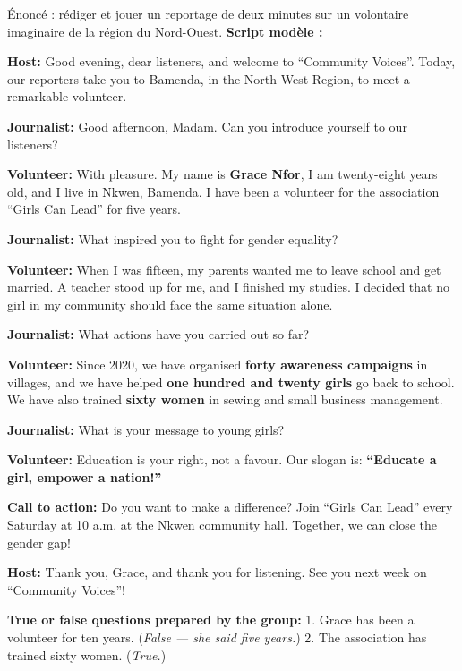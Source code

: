\documentclass[11pt]{article}
\begin{document}
\begin{exoresolu}
Énoncé : rédiger et jouer un reportage de deux minutes sur un volontaire imaginaire de la région du Nord-Ouest.
\tcblower
\textbf{Script modèle :}

\textbf{Host:} Good evening, dear listeners, and welcome to “Community Voices”. Today, our reporters take you to Bamenda, in the North-West Region, to meet a remarkable volunteer.

\textbf{Journalist:} Good afternoon, Madam. Can you introduce yourself to our listeners?

\textbf{Volunteer:} With pleasure. My name is \textbf{Grace Nfor}, I am twenty-eight years old, and I live in Nkwen, Bamenda. I have been a volunteer for the association “Girls Can Lead” for five years.

\textbf{Journalist:} What inspired you to fight for gender equality?

\textbf{Volunteer:} When I was fifteen, my parents wanted me to leave school and get married. A teacher stood up for me, and I finished my studies. I decided that no girl in my community should face the same situation alone.

\textbf{Journalist:} What actions have you carried out so far?

\textbf{Volunteer:} Since 2020, we have organised \textbf{forty awareness campaigns} in villages, and we have helped \textbf{one hundred and twenty girls} go back to school. We have also trained \textbf{sixty women} in sewing and small business management.

\textbf{Journalist:} What is your message to young girls?

\textbf{Volunteer:} Education is your right, not a favour. Our slogan is: \textbf{“Educate a girl, empower a nation!”}

\textbf{Call to action:} Do you want to make a difference? Join “Girls Can Lead” every Saturday at 10 a.m. at the Nkwen community hall. Together, we can close the gender gap!

\textbf{Host:} Thank you, Grace, and thank you for listening. See you next week on “Community Voices”!

\textbf{True or false questions prepared by the group:}
1. Grace has been a volunteer for ten years. (\emph{False — she said five years.})
2. The association has trained sixty women. (\emph{True.})


\end{exoresolu}
\end{document}

